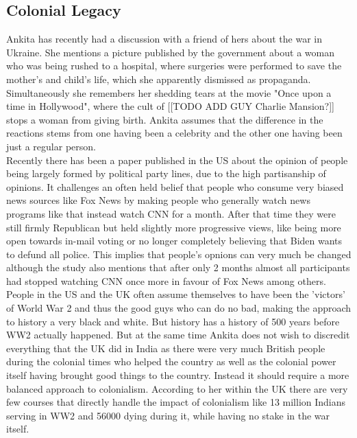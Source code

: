 \documentclass{article}
\begin{document}
	\subsection{Colonial Legacy}
	Ankita has recently had a discussion with a friend of hers about the war in Ukraine. She mentions a picture published by the government about a woman who was being rushed to a hospital, where surgeries were performed to save the mother's and child's life, which she apparently dismissed as propaganda. Simultaneously she remembers her shedding tears at the movie "Once upon a time in Hollywood", where the cult of [[TODO ADD GUY Charlie Mansion?]] stops a woman from giving birth. Ankita assumes that the difference in the reactions stems from one having been a celebrity and the other one having been just a regular person. \\
	Recently there has been a paper published in the US about the opinion of people being largely formed by political party lines, due to the high partisanship of opinions. It challenges an often held belief that people who consume very biased news sources like Fox News by making people who generally watch news programs like that instead watch CNN for a month. After that time they were still firmly Republican but held slightly more progressive views, like being more open towards in-mail voting or no longer completely believing that Biden wants to defund all police. This implies that people's opnions can very much be changed although the study also mentions that after only 2 months almost all participants had stopped watching CNN once more in favour of Fox News among others. \\
	People in the US and the UK often assume themselves to have been the 'victors' of World War 2 and thus the good guys who can do no bad, making the approach to history a very black and white. But history has a history of 500 years before WW2 actually happened. But at the same time Ankita does not wish to discredit everything that the UK did in India as there were very much British people during the colonial times who helped the country as well as the colonial power itself having brought good things to the country. Instead it should require a more balanced approach to colonialism. According to her within the UK there are very few courses that directly handle the impact of colonialism like 13 million Indians serving in WW2 and 56000 dying during it, while having no stake in the war itself. \\
\end{document}
